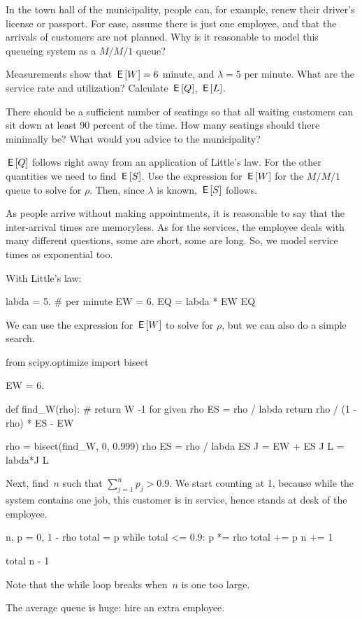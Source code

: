\documentclass[stochastic-or.tex]{subfiles}
\begin{document}
\begin{exercise}
In the town hall of the municipality, people can, for example, renew their driver's license or passport.
For ease, assume there is just one employee, and that the arrivals of customers are not planned.
Why is it reasonable to model this queueing system as a $M/M/1$ queue?

Measurements show that $\,\mathsf{E}\left[W\right] = 6$ minute, and $\lambda=5$ per minute.
What are the service rate and utilization?
Calculate $\,\mathsf{E}\left[Q\right]$, $\,\mathsf{E}\left[L\right]$.

There should be a sufficient number of seatings so that all waiting customers can sit down at least 90 percent of the time.
How many seatings should there minimally be? What would you advice to the municipality?
\begin{hint}
  $\,\mathsf{E}\left[Q\right]$ follows right away from an application of Little's law.
  For the other quantities we need to find $\,\mathsf{E}\left[S\right]$.
  Use the expression for  $\,\mathsf{E}\left[W\right]$ for the $M/M/1$ queue to solve for $\rho$. Then, since $\lambda$ is known, $\,\mathsf{E}\left[S\right]$ follows.
\end{hint}
\begin{solution}
As people arrive without making appointments, it is reasonable to say that the inter-arrival times are memoryless.
As for the services, the employee deals with many different questions, some are short, some are long.
So, we model service times as exponential too.

With Little's law:
\begin{pyconsole}[municipality]
labda = 5. # per minute
EW = 6.
EQ = labda * EW
EQ
\end{pyconsole}

We can use the expression for $\,\mathsf{E}\left[W\right]$ to solve for $\rho$, but we can also do a simple search.
\begin{pyconsole}[municipality]
from scipy.optimize import bisect

EW = 6.

def find_W(rho):
    # return W -1 for given rho
    ES = rho / labda
    return rho / (1 - rho) * ES - EW


rho = bisect(find_W, 0, 0.999)
rho
ES = rho / labda
ES
J = EW + ES
J
L = labda*J
L
\end{pyconsole}
Next, find~$n$ such that $\sum_{j=1}^n p_j > 0.9$.
We start counting at 1, because while the system contains one job, this customer is in service, hence stands at desk of the employee.
\begin{pyconsole}[municipality]
n, p = 0, 1 - rho
total = p
while total <= 0.9:
    p *= rho
    total += p
    n += 1

total
n - 1
\end{pyconsole}
Note that the while loop breaks when~$n$ is one too large.

The average queue is huge: hire an extra employee.
\end{solution}
\end{exercise}
\end{document}
